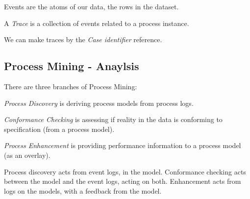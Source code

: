 Events are the atoms of our data, the rows in the dataset.

\begin{definition}
	A \emph{Trace} is a collection of events related to a process instance.
\end{definition}

We can make traces by the \emph{Case identifier} reference.

\subsection*{Process Mining - Anaylsis}

There are three branches of Process Mining:

\begin{definition}
	\emph{Process Discovery} is deriving process models from process logs.
\end{definition}

\begin{definition}
	\emph{Conformance Checking} is assessing if reality in the data is conforming to specification (from a process model).
\end{definition}

\begin{definition}
	\emph{Process Enhancement} is providing performance information to a process model (as an overlay).
\end{definition}

Process discovery acts from event logs, in the model. Conformance checking acts between the model and the event logs, acting on both. Enhancement acts from logs on the models, with a feedback from the model.
